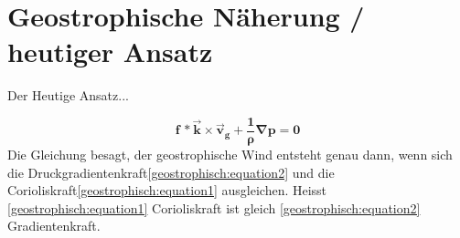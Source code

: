 %
%
%
%
\section{Geostrophische Näherung / heutiger Ansatz
\label{geostrophisch:section:geoNäherung}}
Der Heutige Ansatz... 

\begin{equation}
\boldsymbol{
f\, *\vec{k} \times \vec{v}_g 
+
\frac{1}{\rho} \nabla p
=
0
}
\label{geostrophisch:equation3}
\end{equation}
Die Gleichung besagt, der geostrophische Wind entsteht genau dann, wenn sich die Druckgradientenkraft\eqref{geostrophisch:equation2} und die Corioliskraft\eqref{geostrophisch:equation1} ausgleichen.
Heisst \eqref{geostrophisch:equation1} Corioliskraft ist gleich \eqref{geostrophisch:equation2} Gradientenkraft.




